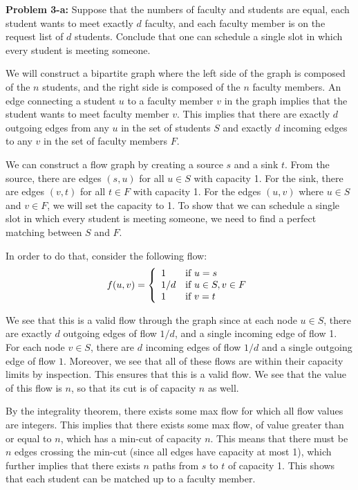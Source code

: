 \documentclass[psamsfonts]{amsart}
\newenvironment{sol}{\vspace{0.25cm}{\large \bfseries Solution:}}{\qedsymbol}
\newenvironment{prob}[1]{\begin{framed}{\large \bfseries Problem #1:}}{\end{framed}}
\begin{document}
\begin{prob}{3-a}
Suppose that the numbers of faculty and students are equal, each student wants to meet exactly $d$ faculty, and each faculty member is on the request list of $d$ students. Conclude that one can schedule a single slot in which every student is meeting someone. 
\end{prob}
\begin{sol}
We will construct a bipartite graph where the left side of the graph is composed of the $n$ students, and the right side is composed of the $n$ faculty members. An edge connecting a student $u$ to a faculty member $v$ in the graph implies that the student wants to meet faculty member $v$. This implies that there are exactly $d$ outgoing edges from any $u$ in the set of students $S$ and exactly $d$ incoming edges to any $v$ in the set of faculty members $F$. 

We can construct a flow graph by creating a source $s$ and a sink $t$. From the source, there are edges $(s,u)$ for all $u \in S$ with capacity 1. For the sink, there are edges $(v, t)$ for all $t \in F$ with capacity 1. For the edges $(u,v)$ where $u \in S$ and $v \in F$, we will set the capacity to 1. To show that we can schedule a single slot in which every student is meeting someone, we need to find a perfect matching between $S$ and $F$.

In order to do that, consider the following flow: 
\begin{eqnarray}
f(u,v) = \left\{\begin{array}{l l}
1 & \text{if } u = s \\
1/d & \text{if } u \in S, v \in F \\
1 & \text{if } v = t
\end{array}\right.
\end{eqnarray}

We see that this is a valid flow through the graph since at each node $u \in S$, there are exactly $d$ outgoing edges of flow $1/d$, and a single incoming edge of flow 1. For each node $v \in S$, there are $d$ incoming edges of flow $1/d$ and a single outgoing edge of flow $1$. Moreover, we see that all of these flows are within their capacity limits by inspection. This ensures that this is a valid flow. We see that the value of this flow is $n$, so that its cut is of capacity $n$ as well.

By the integrality theorem, there exists some max flow for which all flow values are integers. This implies that there exists some max flow, of value greater than or equal to $n$, which has a min-cut of capacity $n$. This means that there must be $n$ edges crossing the min-cut (since all edges have capacity at most 1), which further implies that there exists $n$ paths from $s$ to $t$ of capacity 1. This shows that each student can be matched up to a faculty member.
\end{sol}
\end{document}

